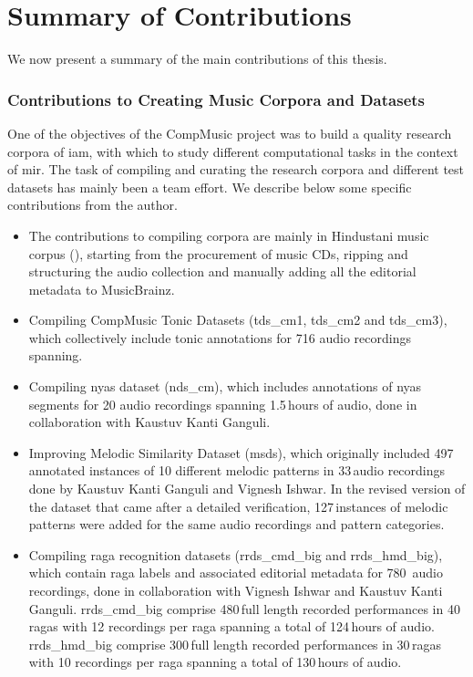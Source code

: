  
\section{Summary of Contributions}
\label{sec:summary_contributions}
We now present a summary of the main contributions of this thesis.

\subsubsection*{Contributions to Creating Music Corpora and Datasets}

One of the objectives of the CompMusic project was to build a quality research corpora of \gls{iam}, with which to study different computational tasks in the context of \gls{mir}. The task of compiling and curating the research corpora and different test datasets has mainly been a team effort. We describe below some specific contributions from the author. 

\begin{itemize}
	
	\item The contributions to compiling corpora are mainly in Hindustani music corpus (), starting from the procurement of music CDs, ripping and structuring the audio collection and manually adding all the editorial metadata to MusicBrainz. 
	
	\item Compiling CompMusic Tonic Datasets (\acrshort{tds_cm1}, \acrshort{tds_cm2} and \acrshort{tds_cm3}), which collectively include tonic annotations for 716 audio recordings spanning. 
	
	\item Compiling \Gls{nyas} dataset (\acrshort{nds_cm}), which includes annotations of \gls{nyas} segments for 20 audio recordings spanning 1.5\,hours of audio, done in collaboration with Kaustuv Kanti Ganguli. 
	\item Improving Melodic Similarity Dataset (\acrshort{msds}), which originally included 497 annotated instances of 10 different melodic patterns in 33\,audio recordings done by Kaustuv Kanti Ganguli and Vignesh Ishwar. In the revised version of the dataset that came after a detailed verification, 127\,instances of melodic patterns were added for the same audio recordings and pattern categories. 
	\item Compiling \Gls{raga} recognition datasets (\acrshort{rrds_cmd_big} and \acrshort{rrds_hmd_big}), which contain \gls{raga} labels and associated editorial metadata for 780\, audio recordings, done in collaboration with Vignesh Ishwar and Kaustuv Kanti Ganguli. \acrshort{rrds_cmd_big} comprise 480\,full length recorded performances in 40\,\glspl{raga} with 12 recordings per \gls{raga} spanning a total of 124\,hours of audio. \acrshort{rrds_hmd_big} comprise 300\,full length recorded performances in 30\,\glspl{raga} with 10 recordings per raga spanning a total of 130\,hours of audio.
\end{itemize}

